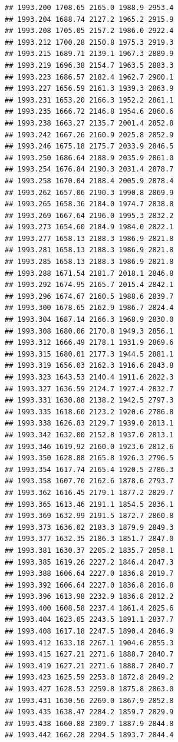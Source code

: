 \documentclass[
]{book}
\begin{document}
\begin{verbatim}
## 1993.200 1708.65 2165.0 1988.9 2953.4
## 1993.204 1688.74 2127.2 1965.2 2915.9
## 1993.208 1705.05 2157.2 1986.0 2922.4
## 1993.212 1700.28 2150.8 1975.3 2919.3
## 1993.215 1689.71 2139.1 1967.3 2889.9
## 1993.219 1696.38 2154.7 1963.5 2883.3
## 1993.223 1686.57 2182.4 1962.7 2900.1
## 1993.227 1656.59 2161.3 1939.3 2863.9
## 1993.231 1653.20 2166.3 1952.2 2861.1
## 1993.235 1666.72 2146.8 1954.6 2860.6
## 1993.238 1663.27 2135.7 2001.4 2852.8
## 1993.242 1667.26 2160.9 2025.8 2852.9
## 1993.246 1675.18 2175.7 2033.9 2846.5
## 1993.250 1686.64 2188.9 2035.9 2861.0
## 1993.254 1676.84 2190.3 2031.4 2878.7
## 1993.258 1670.04 2188.4 2005.9 2878.4
## 1993.262 1657.06 2190.3 1990.8 2869.9
## 1993.265 1658.36 2184.0 1974.7 2838.8
## 1993.269 1667.64 2196.0 1995.3 2832.2
## 1993.273 1654.60 2184.9 1984.0 2822.1
## 1993.277 1658.13 2188.3 1986.9 2821.8
## 1993.281 1658.13 2188.3 1986.9 2821.8
## 1993.285 1658.13 2188.3 1986.9 2821.8
## 1993.288 1671.54 2181.7 2018.1 2846.8
## 1993.292 1674.95 2165.7 2015.4 2842.1
## 1993.296 1674.67 2160.5 1988.6 2839.7
## 1993.300 1678.65 2162.9 1986.7 2824.4
## 1993.304 1687.14 2166.3 1968.9 2830.0
## 1993.308 1680.06 2170.8 1949.3 2856.1
## 1993.312 1666.49 2178.1 1931.9 2869.6
## 1993.315 1680.01 2177.3 1944.5 2881.1
## 1993.319 1656.03 2162.3 1916.6 2843.8
## 1993.323 1643.53 2140.4 1911.6 2822.3
## 1993.327 1636.59 2124.7 1927.4 2832.7
## 1993.331 1630.88 2138.2 1942.5 2797.3
## 1993.335 1618.60 2123.2 1920.6 2786.8
## 1993.338 1626.83 2129.7 1939.0 2813.1
## 1993.342 1632.00 2152.8 1937.0 2813.1
## 1993.346 1619.92 2160.0 1923.6 2812.6
## 1993.350 1628.88 2165.8 1926.3 2796.5
## 1993.354 1617.74 2165.4 1920.5 2786.3
## 1993.358 1607.70 2162.6 1878.6 2793.7
## 1993.362 1616.45 2179.1 1877.2 2829.7
## 1993.365 1613.46 2191.1 1854.5 2836.1
## 1993.369 1632.99 2191.5 1872.7 2860.8
## 1993.373 1636.02 2183.3 1879.9 2849.3
## 1993.377 1632.35 2186.3 1851.7 2847.0
## 1993.381 1630.37 2205.2 1835.7 2858.1
## 1993.385 1619.26 2227.2 1846.4 2847.3
## 1993.388 1606.64 2227.0 1836.8 2819.7
## 1993.392 1606.64 2227.0 1836.8 2816.8
## 1993.396 1613.98 2232.9 1836.8 2812.2
## 1993.400 1608.58 2237.4 1861.4 2825.6
## 1993.404 1623.05 2243.5 1891.1 2837.7
## 1993.408 1617.18 2247.5 1890.4 2846.9
## 1993.412 1633.18 2267.1 1904.6 2855.3
## 1993.415 1627.21 2271.6 1888.7 2840.7
## 1993.419 1627.21 2271.6 1888.7 2840.7
## 1993.423 1625.59 2253.8 1872.8 2849.2
## 1993.427 1628.53 2259.8 1875.8 2863.0
## 1993.431 1630.56 2269.0 1867.9 2852.8
## 1993.435 1638.47 2284.2 1859.7 2829.9
## 1993.438 1660.88 2309.7 1887.9 2844.8
## 1993.442 1662.28 2294.5 1893.7 2844.4

\end{verbatim}
\end{document}
